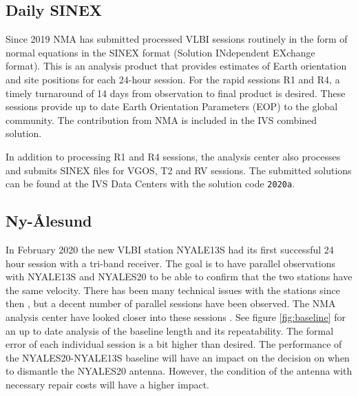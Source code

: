 \documentclass[twocolumn,twoside]{svmultivs_br} %
\begin{document}
  
\subsection{Daily SINEX}
Since 2019 NMA has submitted processed VLBI sessions routinely in the form of normal equations in the SINEX
format (Solution INdependent EXchange format). This is an analysis product that provides estimates of Earth 
orientation and site positions for each 24-hour session. For the rapid sessions R1 and R4, a timely turnaround 
of 14 days from observation to final product is desired. These sessions provide up to date Earth Orientation 
Parameters (EOP) to the global community. The contribution from NMA is included in the IVS combined solution.

In addition to processing R1 and R4 sessions, the analysis center also processes and submits SINEX files for VGOS, 
T2 and RV sessions. The submitted solutions can be found at the IVS
Data Centers with the solution code \texttt{2020a}. 

\subsection{Ny-\AA lesund}
In February 2020 the new VLBI station NYALE13S had its first successful 24 hour session with a tri-band receiver.
The goal is to have parallel observations with NYALE13S and NYALES20 to be able to confirm that the two stations
have the same velocity. There has been many technical issues with the stations since then \cite{ivsgm2022-nyal}, 
but a decent number of parallel sessions have been observed. The NMA analysis center have looked closer into these
sessions \cite{evga-baseline}. See figure \ref{fig:baseline} for an up to date analysis of the baseline length and
its repeatability. The formal error of each individual session is a bit higher than desired. The performance of the
NYALES20-NYALE13S baseline will have an impact on the decision on when to dismantle the NYALES20 antenna. However,
the condition of the antenna with necessary repair costs will have a higher impact. 
\end{document}
